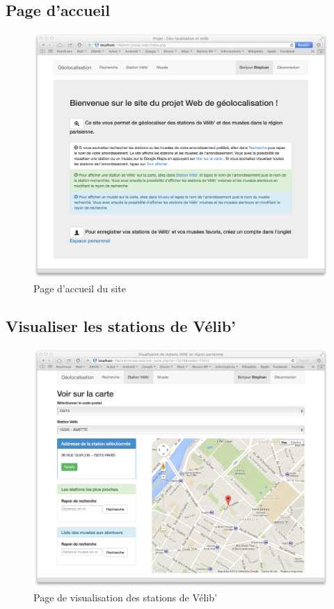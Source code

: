 \documentclass[a4paper]{article}
\begin{document}
\subsection{Page d'accueil}
\begin{figure}[!h]
\centering
\includegraphics[width = 13cm,keepaspectratio=TRUE]{index}
\caption{Page d'accueil du site}
\end{figure}

\subsection{Visualiser les stations de Vélib'}
\begin{figure}[!h]
\centering
\includegraphics[width = 13cm,keepaspectratio=TRUE]{velib}
\caption{Page de visualisation des stations de Vélib'}
\end{figure}
\end{document}
